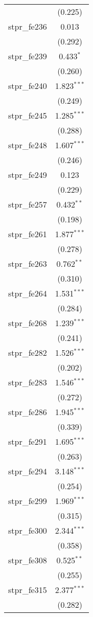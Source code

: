 \begin{table}[!htbp]
\begin{tabular}{@{\extracolsep{5pt}}lc}
  & (0.225) \\ 
  stpr\_fe236 & 0.013 \\ 
  & (0.292) \\ 
  stpr\_fe239 & 0.433$^{*}$ \\ 
  & (0.260) \\ 
  stpr\_fe240 & 1.823$^{***}$ \\ 
  & (0.249) \\ 
  stpr\_fe245 & 1.285$^{***}$ \\ 
  & (0.288) \\ 
  stpr\_fe248 & 1.607$^{***}$ \\ 
  & (0.246) \\ 
  stpr\_fe249 & 0.123 \\ 
  & (0.229) \\ 
  stpr\_fe257 & 0.432$^{**}$ \\ 
  & (0.198) \\ 
  stpr\_fe261 & 1.877$^{***}$ \\ 
  & (0.278) \\ 
  stpr\_fe263 & 0.762$^{**}$ \\ 
  & (0.310) \\ 
  stpr\_fe264 & 1.531$^{***}$ \\ 
  & (0.284) \\ 
  stpr\_fe268 & 1.239$^{***}$ \\ 
  & (0.241) \\ 
  stpr\_fe282 & 1.526$^{***}$ \\ 
  & (0.202) \\ 
  stpr\_fe283 & 1.546$^{***}$ \\ 
  & (0.272) \\ 
  stpr\_fe286 & 1.945$^{***}$ \\ 
  & (0.339) \\ 
  stpr\_fe291 & 1.695$^{***}$ \\ 
  & (0.263) \\ 
  stpr\_fe294 & 3.148$^{***}$ \\ 
  & (0.254) \\ 
  stpr\_fe299 & 1.969$^{***}$ \\ 
  & (0.315) \\ 
  stpr\_fe300 & 2.344$^{***}$ \\ 
  & (0.358) \\ 
  stpr\_fe308 & 0.525$^{**}$ \\ 
  & (0.255) \\ 
  stpr\_fe315 & 2.377$^{***}$ \\ 
  & (0.282) \\ 

\end{tabular}
\end{table}
